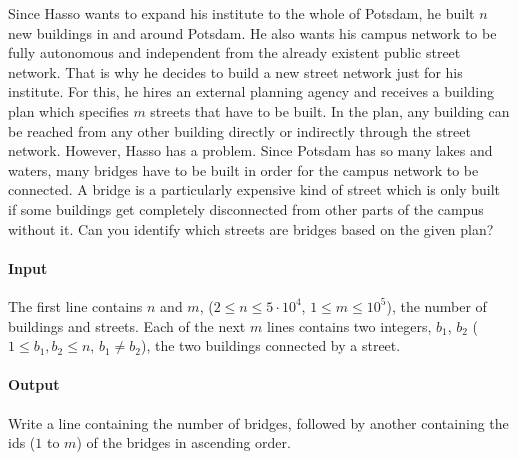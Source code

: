 



\makeheader

Since Hasso wants to expand his institute to the whole of Potsdam, he built $n$ new buildings in and around Potsdam.
He also wants his campus network to be fully autonomous and independent from the already existent public street network.
That is why he decides to build a new street network just for his institute.
For this, he hires an external planning agency and receives a building plan which specifies $m$ streets that have to be built.
In the plan, any building can be reached from any other building directly or indirectly through the street network.
However, Hasso has a problem.
Since Potsdam has so many lakes and waters, many bridges have to be built in order for the campus network to be connected.
A bridge is a particularly expensive kind of street which is only built if some buildings get completely disconnected from other parts of the campus without it.
Can you identify which streets are bridges based on the given plan? 

\paragraph*{Input}

The first line contains $n$ and $m$, ($2 \leq n \leq 5 \cdot 10^4$, $1 \leq m \leq 10^5$), the number of buildings and streets.
Each of the next $m$ lines contains two integers, $b_1$, $b_2$ ($1 \leq b_1,b_2\leq n$, $b_1 \neq b_2$), the two buildings connected by a street.

\paragraph*{Output}

Write a line containing the number of bridges, followed by another
containing the ids ($1$ to $m$) of the bridges in ascending order.

\begin{samples}
\end{samples}

